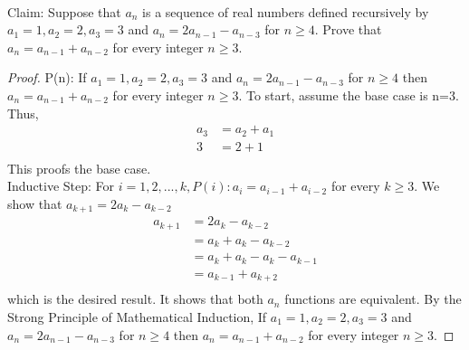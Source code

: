 \documentclass[12pt]{article}
\newenvironment{problem}[2][Problem]{\begin{trivlist}
\item[\hskip \labelsep {\bfseries #1}\hskip \labelsep {\bfseries #2.}]}{\end{trivlist}}
\begin{document}
\begin{problem}{4}
\text{ }\\
 Claim: Suppose that $a_n$ is a sequence of real numbers defined recursively by $a_1=1,a_2=2,a_3=3$ and $a_n=2a_{n-1}-a_{n-3}$ for $n \geq 4$. Prove that $a_n=a_{n-1}+a_{n-2}$ for every integer $n \geq 3$.
\end{problem}
\begin{proof}
P(n): If $a_1=1,a_2=2,a_3=3$ and $a_n=2a_{n-1}-a_{n-3}$ for $n \geq 4$ then $a_n=a_{n-1}+a_{n-2}$ for every integer $n \geq 3$. To start, assume the base case is n=3. Thus, 
\begin{align}
\nonumber
a_3&= a_2 + a_1
\\\nonumber
3&= 2 + 1
\\\nonumber
\end{align}
This proofs the base case. \\
Inductive Step: For $i={1,2,...,k}, P(i): a_i=a_{i-1}+a_{i-2}$ for every $k \geq 3$. We show that $a_{k+1}=2a_{k}-a_{k-2}$
\begin{align}
\nonumber
a_{k+1}&=2a_{k}-a_{k-2}
\\\nonumber
&=a_{k}+a_{k}-a_{k-2}
\\\nonumber
&=a_{k}+a_{k}-a_{k}-a_{k-1}
\\\nonumber
&=a_{k-1}+a_{k+2}
\\\nonumber
\end{align}
which is the desired result. It shows that both $a_n$ functions are equivalent. By the Strong Principle of Mathematical Induction, If $a_1=1,a_2=2,a_3=3$ and $a_n=2a_{n-1}-a_{n-3}$ for $n \geq 4$ then $a_n=a_{n-1}+a_{n-2}$ for every integer $n \geq 3$.
\end{proof}
\end{document}
